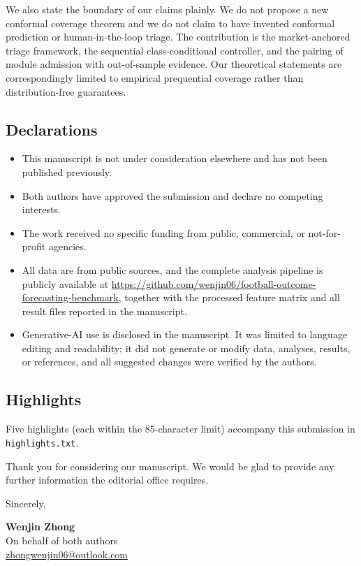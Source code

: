 \documentclass[11pt]{article}
\begin{document}
We also state the boundary of our claims plainly. We do not propose a new
conformal coverage theorem and we do not claim to have invented conformal
prediction or human-in-the-loop triage. The contribution is the market-anchored
triage framework, the sequential class-conditional controller, and the pairing
of module admission with out-of-sample evidence. Our theoretical statements are
correspondingly limited to empirical prequential coverage rather than
distribution-free guarantees.

\subsection*{Declarations}

\begin{itemize}
\sloppy
\item This manuscript is not under consideration elsewhere and has not been
published previously.
\item Both authors have approved the submission and declare no competing
interests.
\item The work received no specific funding from public, commercial, or
not-for-profit agencies.
\item All data are from public sources, and the complete analysis pipeline is
publicly available at
\url{https://github.com/wenjin06/football-outcome-forecasting-benchmark},
together with the processed feature matrix and all result files reported in the
manuscript.
\item Generative-AI use is disclosed in the manuscript. It was limited to
language editing and readability; it did not generate or modify data,
analyses, results, or references, and all suggested changes were verified by
the authors.
\end{itemize}

\subsection*{Highlights}

Five highlights (each within the 85-character limit) accompany this submission
in \texttt{highlights.txt}.

\vspace{0.6em}
\noindent Thank you for considering our manuscript. We would be glad to provide
any further information the editorial office requires.

\vspace{1.0em}
\noindent Sincerely,

\vspace{0.6em}
\noindent\textbf{Wenjin Zhong}\\
On behalf of both authors\\
\href{mailto:zhongwenjin06@outlook.com}{zhongwenjin06@outlook.com}
\end{document}
